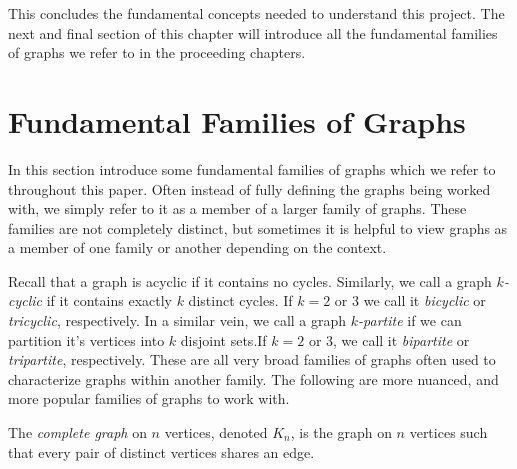 This concludes the fundamental concepts needed to understand this project. The next and final section of this chapter will introduce all the fundamental families of graphs we refer to in the proceeding chapters.

\section{Fundamental Families of Graphs}

In this section introduce some fundamental families of graphs which we refer to throughout this paper. Often instead of fully defining the graphs being worked with, we simply refer to it as a member of a larger family of graphs. These families are not completely distinct, but sometimes it is helpful to view graphs as a member of one family or another depending on the context.

Recall that a graph is acyclic if it contains no cycles. Similarly, we call a graph \textit{$k$-cyclic} if it contains exactly $k$ distinct cycles. If $k=2\text{ or }3$ we call it \textit{bicyclic} or \textit{tricyclic}, respectively. In a similar vein, we call a graph \textit{$k$-partite} if we can partition it's vertices into $k$ disjoint sets.If $k=2\text{ or }3$, we call it \textit{bipartite} or \textit{tripartite}, respectively. These are all very broad families of graphs often used to characterize graphs within another family. The following are more nuanced, and more popular families of graphs to work with.

\begin{definition}
    The \textit{complete graph} on $n$ vertices, denoted $K_n$, is the
    graph on $n$ vertices such that every pair of distinct vertices shares an edge.
\end{definition}

